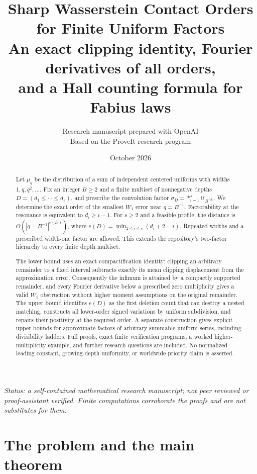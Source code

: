 \documentclass[11pt,letterpaper]{article}
\title{\bfseries Sharp Wasserstein Contact Orders\\for Finite Uniform Factors\\[5pt]\large An exact clipping identity, Fourier derivatives of all orders,\\and a Hall counting formula for Fabius laws}
\author{Research manuscript prepared with OpenAI\\Based on the ProveIt research program}
\date{October 2026}
\theoremstyle{definition}
\theoremstyle{remark}
\newcommand{\Un}{\mathcal U}
\begin{document}
\maketitle
\begin{abstract}
Let $\mu_q$ be the distribution of a sum of independent centered uniforms with widths $1,q,q^2,\ldots$. Fix an integer $B\ge2$ and a finite multiset of nonnegative depths $D=(d_1\le\cdots\le d_s)$, and prescribe the convolution factor $\sigma_D=\mathop{*}_{i=1}^s\Un_{B^{-d_i}}$. We determine the exact order of the smallest $W_1$ error near $q=B^{-1}$. Factorability at the resonance is equivalent to $d_i\ge i-1$. For $s\ge2$ and a feasible profile, the distance is $\Theta(|q-B^{-1}|^{e(D)})$, where $e(D)=\min_{2\le i\le s}(d_i+2-i)$. Repeated widths and a prescribed width-one factor are allowed. This extends the repository's two-factor hierarchy to every finite depth multiset.

The lower bound uses an exact compactification identity: clipping an arbitrary remainder to a fixed interval subtracts exactly its mean clipping displacement from the approximation error. Consequently the infimum is attained by a compactly supported remainder, and every Fourier derivative below a prescribed zero multiplicity gives a valid $W_1$ obstruction without higher moment assumptions on the original remainder. The upper bound identifies $e(D)$ as the first deletion count that can destroy a nested matching, constructs all lower-order signed variations by uniform subdivision, and repairs their positivity at the required order. A separate construction gives explicit upper bounds for approximate factors of arbitrary summable uniform series, including divisibility ladders. Full proofs, exact finite verification programs, a worked higher-multiplicity example, and further research questions are included. No normalized leading constant, growing-depth uniformity, or worldwide priority claim is asserted.
\end{abstract}
\begin{center}
\small\textit{Status: a self-contained mathematical research manuscript; not peer reviewed or proof-assistant verified. Finite computations corroborate the proofs and are not substitutes for them.}
\end{center}
\newpage
\tableofcontents
\newpage

\section{The problem and the main theorem}\label{sec:intro}
\end{document}
